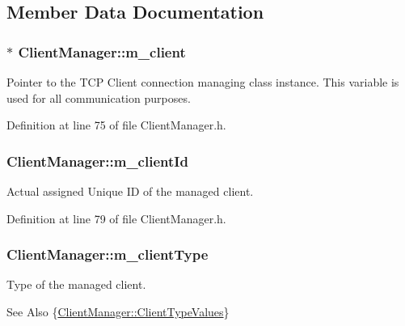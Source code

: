 \subsection{Member Data Documentation}
\hypertarget{class_client_manager_a86ae04f2ac9f2988559a023d877f78e4}{
\subsubsection[{m\-\_\-client}]{$\ast$ Client\-Manager\-::m\-\_\-client\hspace{0.3cm}{\ttfamily [private]}}}\label{class_client_manager_a86ae04f2ac9f2988559a023d877f78e4}
Pointer to the T\-C\-P Client connection managing class instance. This variable is used for all communication purposes. 

Definition at line 75 of file Client\-Manager.\-h.

\hypertarget{class_client_manager_a1216ffa88107c33825adafe63fea2263}{
\subsubsection[{m\-\_\-client\-Id}]{ Client\-Manager\-::m\-\_\-client\-Id\hspace{0.3cm}{\ttfamily [private]}}}\label{class_client_manager_a1216ffa88107c33825adafe63fea2263}
Actual assigned Unique I\-D of the managed client. 

Definition at line 79 of file Client\-Manager.\-h.

\hypertarget{class_client_manager_af40c31ade3f23b705bce2a8b3d311ce6}{
\subsubsection[{m\-\_\-client\-Type}]{ Client\-Manager\-::m\-\_\-client\-Type\hspace{0.3cm}{\ttfamily [private]}}}\label{class_client_manager_af40c31ade3f23b705bce2a8b3d311ce6}
Type of the managed client. \begin{DoxySeeAlso}{See Also}
\{\hyperlink{class_client_manager_ac12239be9a30847f677a32910822d40b}{Client\-Manager\-::\-Client\-Type\-Values}\} 
\end{DoxySeeAlso}


